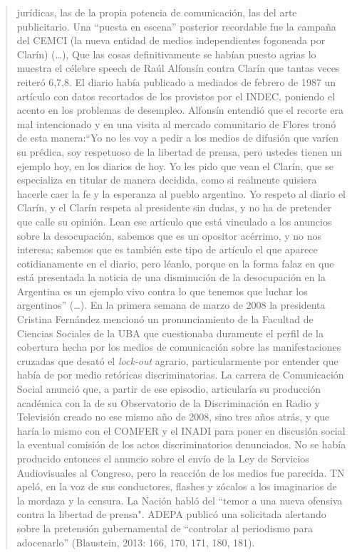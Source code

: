 {\begin{quote}
jurídicas, las de la propia potencia de comunicación, las del arte publicitario. Una ``puesta en escena'' posterior recordable fue la campaña del CEMCI (la nueva entidad de medios independientes fogoneada por Clarín) (\ldots), Que las cosas definitivamente se habían puesto agrias lo muestra el célebre speech de Raúl Alfonsín contra Clarín que tantas veces reiteró 6,7,8. El diario había publicado a mediados de febrero de 1987 un artículo con datos recortados de los provistos por el INDEC, poniendo el acento en los problemas de desempleo. Alfonsín entendió que el recorte era mal intencionado y en una visita al mercado comunitario de Flores tronó de esta manera:``Yo no les voy a pedir a los medios de difusión que varíen su prédica, soy respetuoso de la libertad de prensa, pero ustedes tienen un ejemplo hoy, en los diarios de hoy. Yo les pido que vean el Clarín, que se especializa en titular de manera decidida, como si realmente quisiera hacerle caer la fe y la esperanza al pueblo argentino. Yo respeto al diario el Clarín, y el Clarín respeta al presidente sin dudas, y no ha de pretender que calle su opinión. Lean ese artículo que está vinculado a los anuncios sobre la desocupación, sabemos que es un opositor acérrimo, y no nos interesa; sabemos que es también este tipo de artículo el que aparece cotidianamente en el diario, pero léanlo, porque en la forma falaz en que está presentada la noticia de una disminución de la desocupación en la Argentina es un ejemplo vivo contra lo que tenemos que luchar los argentinos'' (\ldots). En la primera semana de marzo de 2008 la presidenta Cristina Fernández mencionó un pronunciamiento de la Facultad de Ciencias Sociales de la UBA que cuestionaba duramente el perfil de la cobertura hecha por los medios de comunicación sobre las manifestaciones cruzadas que desató el \emph{lock-out} agrario, particularmente por entender que había de por medio retóricas discriminatorias. La carrera de Comunicación Social anunció que, a partir de ese episodio, articularía su producción académica con la de su Observatorio de la Discriminación en Radio y Televisión creado no ese mismo año de 2008, sino tres años atrás, y que haría lo mismo con el COMFER y el INADI para poner en discusión social la eventual comisión de los actos discriminatorios denunciados. No se había producido entonces el anuncio sobre el envío de la Ley de Servicios Audiovisuales al Congreso, pero la reacción de los medios fue parecida. TN apeló, en la voz de sus conductores, flashes y zócalos a los imaginarios de la mordaza y la censura. La Nación habló del ``temor a una nueva ofensiva contra la libertad de prensa". ADEPA publicó una solicitada alertando sobre la pretensión gubernamental de ``controlar al periodismo para adocenarlo'' (Blaustein, 2013: 166, 170, 171, 180, 181).
\end{quote}

}
